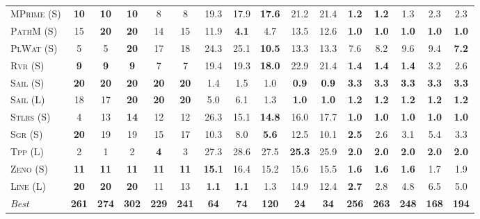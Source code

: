 \documentclass[11pt,landscape]{article}
\begin{document}
\begin{table*}[tb]
{\begin{tabular}{|l||ccccc||ccccc||ccccc||}
\textsc{MPrime} (S)&\textbf{10}&\textbf{10}&\textbf{10}&8&8&19.3&17.9&\textbf{17.6}&21.2&21.4&\textbf{1.2}&\textbf{1.2}&1.3&2.3&2.3\\
\textsc{PathM} (S)&15&\textbf{20}&\textbf{20}&14&15&11.9&\textbf{4.1}&4.7&13.5&12.6&\textbf{1.0}&\textbf{1.0}&\textbf{1.0}&\textbf{1.0}&\textbf{1.0}\\
\textsc{PlWat} (S)&5&5&\textbf{20}&17&18&24.3&25.1&\textbf{10.5}&13.3&13.3&7.6&8.2&9.6&9.4&\textbf{7.2}\\
\textsc{Rvr} (S)&\textbf{9}&\textbf{9}&\textbf{9}&7&7&19.4&19.3&\textbf{18.0}&22.9&21.4&\textbf{1.4}&\textbf{1.4}&\textbf{1.4}&3.2&2.6\\
\textsc{Sail} (S)&\textbf{20}&\textbf{20}&\textbf{20}&\textbf{20}&\textbf{20}&1.4&1.5&1.0&\textbf{0.9}&\textbf{0.9}&\textbf{3.3}&\textbf{3.3}&\textbf{3.3}&\textbf{3.3}&\textbf{3.3}\\
\textsc{Sail} (L)&18&17&\textbf{20}&\textbf{20}&\textbf{20}&5.0&6.1&1.3&\textbf{1.0}&\textbf{1.0}&\textbf{1.2}&\textbf{1.2}&\textbf{1.2}&\textbf{1.2}&\textbf{1.2}\\
\textsc{Stlrs} (S)&4&13&\textbf{14}&12&12&26.3&15.1&\textbf{14.8}&16.0&17.7&\textbf{1.0}&\textbf{1.0}&\textbf{1.0}&\textbf{1.0}&\textbf{1.0}\\
\textsc{Sgr} (S)&\textbf{20}&19&19&15&17&10.3&8.0&\textbf{5.6}&12.5&10.1&\textbf{2.5}&2.6&3.1&5.4&3.3\\
\textsc{Tpp} (L)&2&1&2&\textbf{4}&3&27.3&28.6&27.5&\textbf{25.3}&25.9&\textbf{2.0}&\textbf{2.0}&\textbf{2.0}&\textbf{2.0}&\textbf{2.0}\\
\textsc{Zeno} (S)&\textbf{11}&\textbf{11}&\textbf{11}&\textbf{11}&\textbf{11}&\textbf{15.1}&16.4&15.2&15.6&15.5&\textbf{1.6}&\textbf{1.6}&\textbf{1.6}&1.7&1.9\\
\textsc{Line} (L)&\textbf{20}&\textbf{20}&\textbf{20}&11&13&\textbf{1.1}&\textbf{1.1}&1.3&14.9&12.4&\textbf{2.7}&2.8&4.8&6.5&5.0
\\\hline
\textit{Best}&\textbf{261}&\textbf{274}&\textbf{302}&\textbf{229}&\textbf{241}&\textbf{64}&\textbf{74}&\textbf{120}&\textbf{24}&\textbf{34}&\textbf{256}&\textbf{263}&\textbf{248}&\textbf{168}&\textbf{194}\\\hline

        \end{tabular}}
        \caption{}
        \label{tab:all-patty}
        \end{table*}
        
\end{document}
